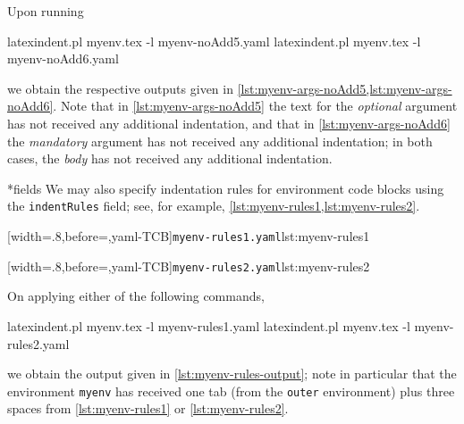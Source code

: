	Upon running
	\begin{commandshell}
latexindent.pl myenv.tex -l myenv-noAdd5.yaml  
latexindent.pl myenv.tex -l myenv-noAdd6.yaml  
\end{commandshell}
	we obtain the respective outputs given in \cref{lst:myenv-args-noAdd5,lst:myenv-args-noAdd6}. Note that in \cref{lst:myenv-args-noAdd5}
	the text for the \emph{optional} argument has not received any additional indentation, and that in \cref{lst:myenv-args-noAdd6} the
	\emph{mandatory} argument has not received any additional indentation; in both cases, the \emph{body} has not received any additional indentation.

	\begin{minipage}{.45\textwidth}
	\end{minipage}
	\hfill
	\begin{minipage}{.45\textwidth}
	\end{minipage}

*{fields}
	We may also specify indentation rules for environment code blocks using the \texttt{indentRules} field; see, for example,
	\cref{lst:myenv-rules1,lst:myenv-rules2}.

	\begin{minipage}{.45\textwidth}
		[width=.8\linewidth,before=\centering,yaml-TCB]{\texttt{myenv-rules1.yaml}}{lst:myenv-rules1}
	\end{minipage}
	\hfill
	\begin{minipage}{.45\textwidth}
		[width=.8\linewidth,before=\centering,yaml-TCB]{\texttt{myenv-rules2.yaml}}{lst:myenv-rules2}
	\end{minipage}

	On applying either of the following commands,
	\begin{commandshell}
latexindent.pl myenv.tex -l myenv-rules1.yaml  
latexindent.pl myenv.tex -l myenv-rules2.yaml  
\end{commandshell}
	we obtain the output given in \cref{lst:myenv-rules-output}; note in particular that the environment \texttt{myenv}
	has received one tab (from the \texttt{outer} environment) plus three spaces from \cref{lst:myenv-rules1} or \ref{lst:myenv-rules2}.

